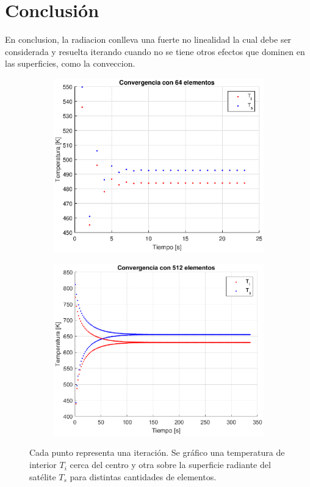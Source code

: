 \documentclass[onecolumn,10pt,titlepage,a4paper]{article}
\begin{document}
\section*{Conclusión}
En conclusion, la radiacion conlleva una fuerte no linealidad la cual debe ser considerada y resuelta iterando cuando no se tiene otros efectos que dominen en las superficies, como la conveccion. 

\begin{figure}[htb!]
	\centering
	\begin{subfigure}{0.47\textwidth}
\includegraphics[width=\textwidth]{fig/conv64.eps}
\label{fig:Convergencia64}
	\end{subfigure}
	\hfill
	\begin{subfigure}{0.5\textwidth}
	\includegraphics[width=\textwidth]{fig/conv512.eps}
\label{fig:Convergencia512}
	\end{subfigure}
\caption{Cada punto representa una iteración. Se gráfico una temperatura de interior $T_i$ cerca del centro y otra sobre la superficie radiante del satélite $T_s$ para distintas cantidades de elementos.}
\label{fig:Convergencia}
\end{figure}
\end{document}
